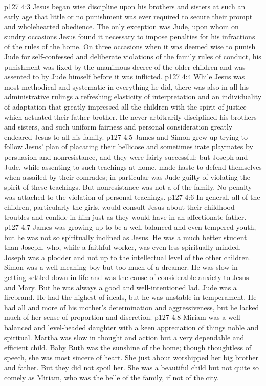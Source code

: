 \vs p127 4:3 Jesus began wise discipline upon his brothers and sisters at such an early age that little or no punishment was ever required to secure their prompt and wholehearted obedience. The only exception was Jude, upon whom on sundry occasions Jesus found it necessary to impose penalties for his infractions of the rules of the home. On three occasions when it was deemed wise to punish Jude for self\hyp{}confessed and deliberate violations of the family rules of conduct, his punishment was fixed by the unanimous decree of the older children and was assented to by Jude himself before it was inflicted.
\vs p127 4:4 While Jesus was most methodical and systematic in everything he did, there was also in all his administrative rulings a refreshing elasticity of interpretation and an individuality of adaptation that greatly impressed all the children with the spirit of justice which actuated their father\hyp{}brother. He never arbitrarily disciplined his brothers and sisters, and such uniform fairness and personal consideration greatly endeared Jesus to all his family.
\vs p127 4:5 James and Simon grew up trying to follow Jesus’ plan of placating their bellicose and sometimes irate playmates by persuasion and nonresistance, and they were fairly successful; but Joseph and Jude, while assenting to such teachings at home, made haste to defend themselves when assailed by their comrades; in particular was Jude guilty of violating the spirit of these teachings. But nonresistance was not a  of the family. No penalty was attached to the violation of personal teachings.
\vs p127 4:6 In general, all of the children, particularly the girls, would consult Jesus about their childhood troubles and confide in him just as they would have in an affectionate father.
\vs p127 4:7 James was growing up to be a well\hyp{}balanced and even\hyp{}tempered youth, but he was not so spiritually inclined as Jesus. He was a much better student than Joseph, who, while a faithful worker, was even less spiritually minded. Joseph was a plodder and not up to the intellectual level of the other children. Simon was a well\hyp{}meaning boy but too much of a dreamer. He was slow in getting settled down in life and was the cause of considerable anxiety to Jesus and Mary. But he was always a good and well\hyp{}intentioned lad. Jude was a firebrand. He had the highest of ideals, but he was unstable in temperament. He had all and more of his mother’s determination and aggressiveness, but he lacked much of her sense of proportion and discretion.
\vs p127 4:8 Miriam was a well\hyp{}balanced and level\hyp{}headed daughter with a keen appreciation of things noble and spiritual. Martha was slow in thought and action but a very dependable and efficient child. Baby Ruth was the sunshine of the home; though thoughtless of speech, she was most sincere of heart. She just about worshipped her big brother and father. But they did not spoil her. She was a beautiful child but not quite so comely as Miriam, who was the belle of the family, if not of the city.
